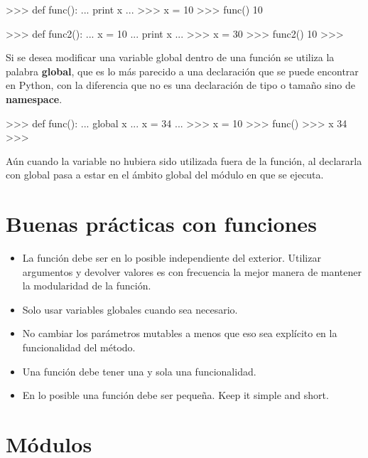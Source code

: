 \begin{pyglist} [language=python]
>>> def func():
...     print x
... 
>>> x = 10
>>> func()
10

>>> def func2():
...     x = 10
...     print x
... 
>>> x = 30
>>> func2()
10
>>> 
\end{pyglist}


Si se desea modificar una variable global dentro de una función se utiliza la palabra \textbf{global}, que es lo más parecido a una declaración que se puede encontrar en Python, con la diferencia que no es una declaración de tipo o tamaño sino de \textbf{namespace}.\\

\begin{pyglist} [language=python]
>>> def func():
...     global x
...     x = 34
... 
>>> x = 10
>>> func()
>>> x
34
>>>
\end{pyglist}

Aún cuando la variable no hubiera sido utilizada fuera de la función, al declararla con global pasa a estar en el ámbito global del módulo en que se ejecuta.


\section{Buenas prácticas con funciones}

\begin{itemize}
\item La función debe ser en lo posible independiente del exterior. Utilizar argumentos y devolver valores es con frecuencia la mejor manera de mantener la modularidad de la función.

\item Solo usar variables globales cuando sea necesario.

\item No cambiar los parámetros mutables a menos que eso sea explícito en la funcionalidad del método.

\item Una función debe tener una y sola una funcionalidad.

\item En lo posible una función debe ser pequeña. Keep it simple and short.
\end{itemize}


\section{Módulos}

